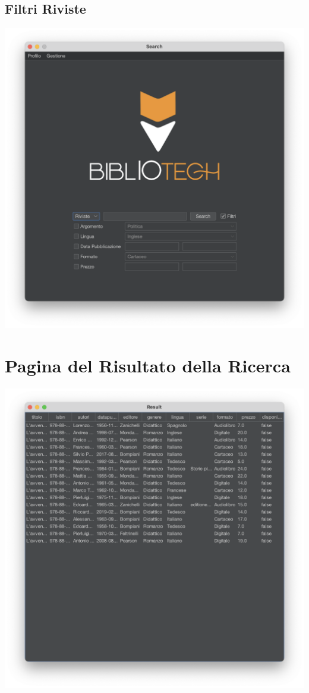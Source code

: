 \subsection{Filtri Riviste}
\includegraphics[scale=0.45]{Immagini/Schermate/Search/SearchPage-FiltriRiviste.png}

\section{Pagina del Risultato della Ricerca}
\includegraphics[scale=0.45]{Immagini/Schermate/Search/ResultPage.png}


